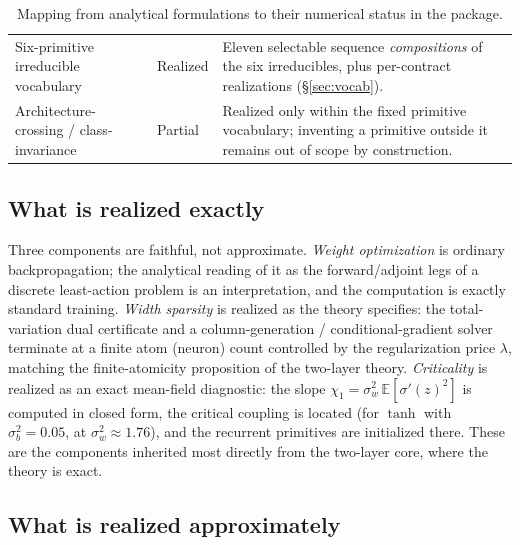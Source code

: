 \documentclass[11pt]{article}
\begin{document}
\begin{table}[t]
\begin{tabular}{p{4.6cm} p{2.1cm} p{6.2cm}}
Six-primitive irreducible vocabulary & Realized & Eleven selectable sequence \emph{compositions} of the six irreducibles, plus per-contract realizations (\S\ref{sec:vocab}).\\
Architecture-crossing / class-invariance & Partial & Realized only within the fixed primitive vocabulary; inventing a primitive outside it remains out of scope by construction.\\
\bottomrule
\end{tabular}
\caption{Mapping from analytical formulations to their numerical status in the package.}
\label{tab:mapping}
\end{table}

\subsection{What is realized exactly}
\label{sec:exact}

Three components are faithful, not approximate. \emph{Weight optimization} is ordinary
backpropagation; the analytical reading of it as the forward/adjoint legs of a discrete
least-action problem is an interpretation, and the computation is exactly standard training.
\emph{Width sparsity} is realized as the theory specifies: the total-variation dual certificate
and a column-generation / conditional-gradient solver terminate at a finite atom (neuron) count
controlled by the regularization price $\lambda$, matching the finite-atomicity proposition of
the two-layer theory. \emph{Criticality} is realized as an exact mean-field diagnostic: the
slope $\chi_1=\sigma_w^2\,\mathbb{E}[\sigma'(z)^2]$ is computed in closed form, the critical
coupling is located (for $\tanh$ with $\sigma_b^2=0.05$, at $\sigma_w^2\approx1.76$), and the
recurrent primitives are initialized there. These are the components inherited most directly
from the two-layer core, where the theory is exact.

\subsection{What is realized approximately}
\label{sec:approx}
\end{document}

